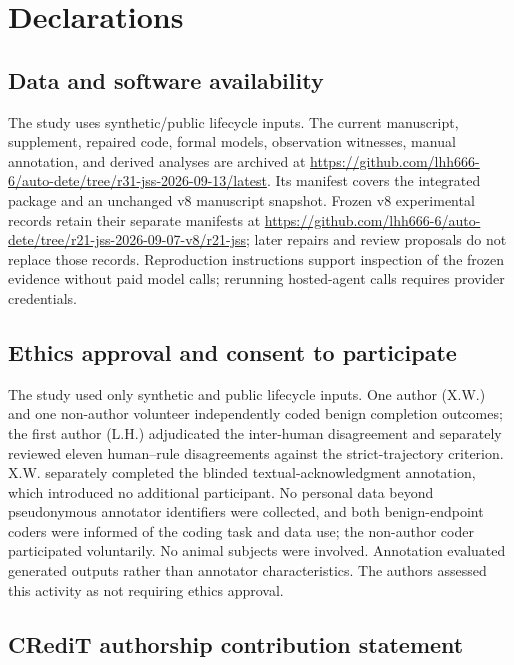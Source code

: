 \section*{Declarations}

\subsection*{Data and software availability}

The study uses synthetic/public lifecycle inputs. The current manuscript, supplement, repaired code, formal models, observation witnesses, manual annotation, and derived analyses are archived at \url{https://github.com/lhh666-6/auto-dete/tree/r31-jss-2026-09-13/latest}. Its manifest covers the integrated package and an unchanged v8 manuscript snapshot. Frozen v8 experimental records retain their separate manifests at \url{https://github.com/lhh666-6/auto-dete/tree/r21-jss-2026-09-07-v8/r21-jss}; later repairs and review proposals do not replace those records. Reproduction instructions support inspection of the frozen evidence without paid model calls; rerunning hosted-agent calls requires provider credentials.

\subsection*{Ethics approval and consent to participate}

The study used only synthetic and public lifecycle inputs. One author (X.W.) and one non-author volunteer independently coded benign completion outcomes; the first author (L.H.) adjudicated the inter-human disagreement and separately reviewed eleven human--rule disagreements against the strict-trajectory criterion. X.W. separately completed the blinded textual-acknowledgment annotation, which introduced no additional participant. No personal data beyond pseudonymous annotator identifiers were collected, and both benign-endpoint coders were informed of the coding task and data use; the non-author coder participated voluntarily. No animal subjects were involved. Annotation evaluated generated outputs rather than annotator characteristics. The authors assessed this activity as not requiring ethics approval.

\subsection*{CRediT authorship contribution statement}

